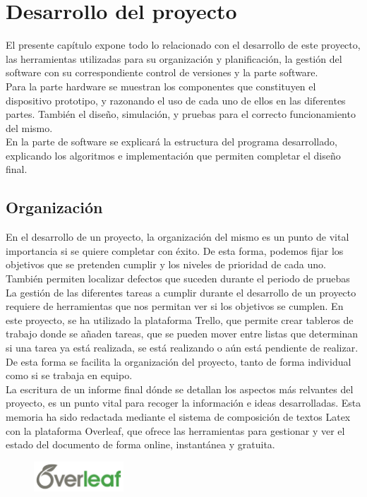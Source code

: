 \chapter{Desarrollo del proyecto}
El presente capítulo expone todo lo relacionado con el desarrollo de este proyecto, las herramientas utilizadas para su organización y planificación, la gestión del software con su correspondiente control de versiones y la parte software.
\\

Para la parte hardware se muestran los componentes que constituyen el dispositivo prototipo, y razonando el uso de cada uno de ellos en las diferentes partes. También el diseño, simulación, y pruebas para el correcto funcionamiento del mismo.
\\

En la parte de software se explicará la estructura del programa desarrollado, explicando los algoritmos e implementación que permiten completar el diseño final.

\section{Organización}
En el desarrollo de un proyecto, la organización del mismo es un punto de vital importancia si se quiere completar con éxito. De esta forma, podemos fijar los objetivos que se pretenden cumplir y los niveles de prioridad de cada uno. También permiten localizar defectos que suceden durante el periodo de pruebas
\\

La gestión de las diferentes tareas a cumplir durante el desarrollo de un proyecto requiere de herramientas que nos permitan ver si los objetivos se cumplen. En este proyecto, se ha utilizado la plataforma Trello, que permite crear tableros de trabajo donde se añaden tareas, que se pueden mover entre listas que determinan si una tarea ya está realizada, se está realizando o aún está pendiente de realizar. De esta forma se facilita la organización del proyecto, tanto de forma individual como si se trabaja en equipo.
\\

La escritura de un informe final dónde se detallan los aspectos más relvantes del proyecto, es un punto vital para recoger la información e ideas desarrolladas. Esta memoria ha sido redactada mediante el sistema de composición de textos Latex con la plataforma Overleaf, que ofrece las herramientas para gestionar y ver el estado del documento de forma online, instantánea y gratuita. 
\\
\begin{figure}[h]
  \centering
  \includegraphics[width=0.3\textwidth]{imagenes/overleaf.png}\\[1cm]
\end{figure}

